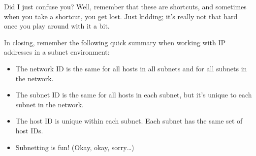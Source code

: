 Did I just confuse you? Well, remember that these are shortcuts, and
sometimes when you take a shortcut, you get lost. Just kidding; it's
really not that hard once you play around with it a bit.

In closing, remember the following quick summary when working with IP addresses in a subnet environment:

\begin{itemize}
   \item
      The network ID is the same for all hosts in all subnets and for all subnets in the network.
   \item
      The subnet ID is the same for all hosts in each subnet, but it's unique to each subnet in the network.
   \item
      The host ID is unique within each subnet.
      Each subnet has the same set of host IDs.
   \item
      Subnetting is fun! (Okay, okay, sorry\ldots)
\end{itemize}
